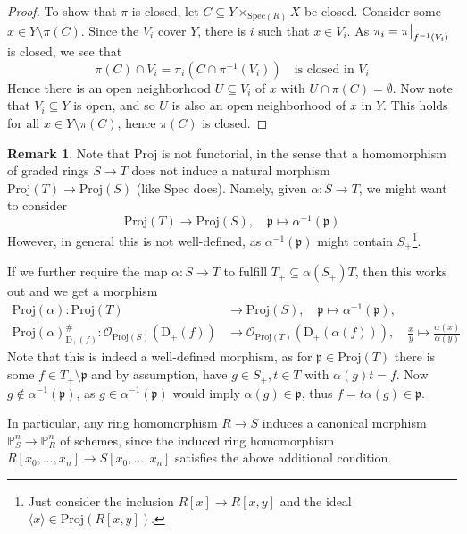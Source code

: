 \documentclass{scrartcl}
\newcommand{\D}[1]{\mathrm{D}_+(#1)}
\renewcommand{\P}{\mathbb{P}}
\newcommand{\p}{\mathfrak{p}}
\newcommand{\Spec}{\mathrm{Spec}}
\newcommand{\Proj}{\mathrm{Proj}}
\renewcommand{\O}{\mathcal{O}}
\newcommand\restr[2]{{
    \left.\kern-\nulldelimiterspace
    #1
    \vphantom{\big|}
    \right|_{#2}
}}
\theoremstyle{definition}
\newtheorem{remark}[subsection]{Remark}
\begin{document}
\begin{proof}
    To show that $\pi$ is closed, let $C \subseteq Y \times_{\Spec(R)} X$ be closed.
    Consider some $x \in Y \setminus \pi(C)$.
    Since the $V_i$ cover $Y$, there is $i$ such that $x \in V_i$.
    As $\pi_i = \restr{\pi}{f^{-1}(V_i)}$ is closed, we see that
    \begin{equation*}
        \pi(C) \cap V_i = \pi_i(C \cap \pi^{-1}(V_i)) \quad \text{is closed in $V_i$}
    \end{equation*}
    Hence there is an open neighborhood $U \subseteq V_i$ of $x$ with $U \cap \pi(C) = \emptyset$.
    Now note that $V_i \subseteq Y$ is open, and so $U$ is also an open neighborhood of $x$ in $Y$.
    This holds for all $x \in Y \setminus \pi(C)$, hence $\pi(C)$ is closed.
\end{proof}
\begin{remark}
    \label{prop:functoriality_proj}
    Note that $\Proj$ is not functorial, in the sense that a homomorphism of graded rings $S \to T$ does not induce a natural morphism $\Proj(T) \to \Proj(S)$ (like $\Spec$ does).
    Namely, given $\alpha: S \to T$, we might want to consider
    \begin{equation*}
        \Proj(T) \to \Proj(S), \quad \p \mapsto \alpha^{-1}(\p)
    \end{equation*}
    However, in general this is not well-defined, as $\alpha^{-1}(\p)$ might contain $S_+$\footnote{Just consider the inclusion $R[x] \to R[x, y]$ and the ideal $\langle x \rangle \in \Proj(R[x, y])$.}.

    If we further require the map $\alpha: S \to T$ to fulfill $T_+ \subseteq \alpha(S_+)T$, then this works out and we get a morphism
    \begin{align*}
        \Proj(\alpha): \Proj(T) &\to \Proj(S), \quad \p \mapsto \alpha^{-1}(\p), \\
        \Proj(\alpha)^\#_{\D{f}}: \O_{\Proj(S)}(\D{f}) &\to \O_{\Proj(T)}(\D{\alpha(f)}), \quad \frac x y \mapsto \frac {\alpha(x)} {\alpha(y)}
    \end{align*}
    Note that this is indeed a well-defined morphism, as for $\p \in \Proj(T)$ there is some $f \in T_+ \setminus \p$ and by assumption, have $g \in S_+, t \in T$ with $\alpha(g)t = f$.
    Now $g \notin \alpha^{-1}(\p)$, as $g \in \alpha^{-1}(\p)$ would imply $\alpha(g) \in \p$, thus $f = t\alpha(g) \in \p$.

    In particular, any ring homomorphism $R \to S$ induces a canonical morphism $\P_S^n \to \P_R^n$ of schemes, since the induced ring homomorphism $R[x_0, ..., x_n] \to S[x_0, ..., x_n]$ satisfies the above additional condition.
\end{remark}
\end{document}
